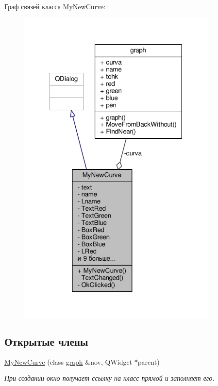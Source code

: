 Граф связей класса My\+New\+Curve\+:\nopagebreak
\begin{figure}[H]
\begin{center}
\leavevmode
\includegraphics[width=284pt]{class_my_new_curve__coll__graph}
\end{center}
\end{figure}
\subsection*{Открытые члены}
\begin{DoxyCompactItemize}
\item 
\hyperlink{class_my_new_curve_a4bcbd4aa358bd6a043e9fc1ebffe7620}{My\+New\+Curve} (class \hyperlink{classgraph}{graph} \&nov, Q\+Widget $\ast$parent)\hypertarget{class_my_new_curve_a4bcbd4aa358bd6a043e9fc1ebffe7620}{}\label{class_my_new_curve_a4bcbd4aa358bd6a043e9fc1ebffe7620}

\begin{DoxyCompactList}\small\item\em При создании окно получает ссылку на класс прямой и заполняет его. \end{DoxyCompactList}\end{DoxyCompactItemize}
